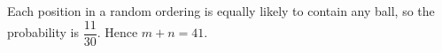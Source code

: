 Each position in a random ordering is equally likely to contain any ball, so the probability is $\dfrac{11}{30}$. Hence $\boxed{m+n=41}$.
